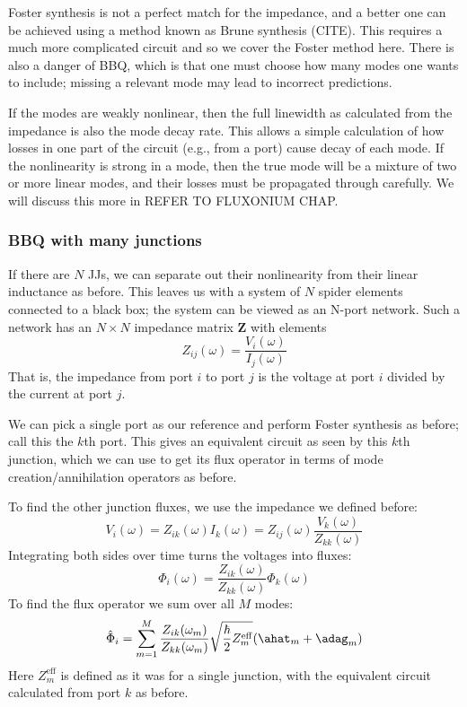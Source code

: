 Foster synthesis is not a perfect match for the impedance, and a better one can be achieved using a method known as Brune synthesis (CITE). This requires a much more complicated circuit and so we cover the Foster method here. There is also a danger of BBQ, which is that one must choose how many modes one wants to include; missing a relevant mode may lead to incorrect predictions.

If the modes are weakly nonlinear, then the full linewidth as calculated from the impedance is also the mode decay rate. This allows a simple calculation of how losses in one part of the circuit (e.g., from a port) cause decay of each mode. If the nonlinearity is strong in a mode, then the true mode will be a mixture of two or more linear modes, and their losses must be propagated through carefully. We will discuss this more in REFER TO FLUXONIUM CHAP.

\subsubsection{BBQ with many junctions}
If there are $N$ JJs, we can separate out their nonlinearity from their linear inductance as before. This leaves us with a system of $N$ spider elements connected to a black box; the system can be viewed as an N-port network. Such a network has an $N\times N$ impedance matrix $\mathbf{Z}$ with elements
\begin{equation}
	Z_{ij}(\omega) = \frac{V_i(\omega)}{I_j(\omega)}
\end{equation}
That is, the impedance from port $i$ to port $j$ is the voltage at port $i$ divided by the current at port $j$. 

We can pick a single port as our reference and perform Foster synthesis as before; call this the $k$th port. This gives an equivalent circuit as seen by this $k$th junction, which we can use to get its flux operator in terms of mode creation/annihilation operators as before.

To find the other junction fluxes, we use the impedance we defined before:
\begin{equation*}
	V_i(\omega) = Z_{ik}(\omega) I_k(\omega) = Z_{ij}(\omega) \frac{V_k(\omega)}{Z_{kk}(\omega)}
\end{equation*}
Integrating both sides over time turns the voltages into fluxes:
\begin{equation}
	\Phi_i(\omega) = \frac{Z_{ik}(\omega)}{Z_{kk}(\omega)} \Phi_k(\omega)
\end{equation}
To find the flux operator we sum over all $M$ modes:
\begin{equation}
	\hat{\Phi}_i = \sum_{m=1}^M \frac{Z_{ik}(\omega_m)}{Z_{kk}(\omega_m)}\sqrt{\frac{\hbar}{2}Z^\mathrm{eff}_m} (\ahat_m+\adag_m)
\end{equation}
Here $Z^\mathrm{eff}_m$ is defined as it was for a single junction, with the equivalent circuit calculated from port $k$ as before.

